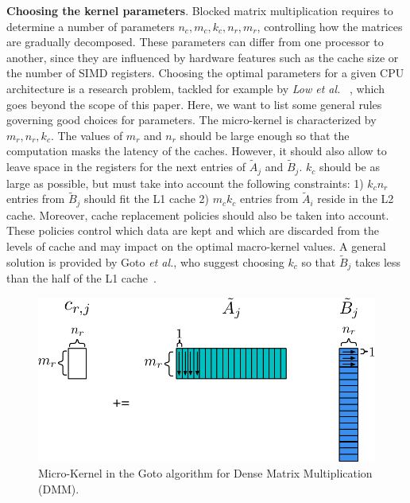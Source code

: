\noindent \textbf{Choosing the  kernel parameters}. Blocked matrix multiplication requires to determine a number of parameters $n_c, m_c, k_c, n_r, m_r$, controlling how the matrices are gradually decomposed. These parameters can differ from one processor to another, since they are influenced by hardware features such as the cache size or the number of SIMD registers. Choosing the optimal parameters for a given CPU architecture is a research problem, tackled for example by \textit{Low et al. }~\cite{low2016analytical}, which goes beyond the scope of this paper. Here, we want to list some general rules governing good choices for parameters. %
The micro-kernel is characterized by $m_r, n_r, k_c$. The values of $m_r$ and $n_r$ should be large enough so that the computation masks the latency of the caches. However, it should also allow to leave space in the registers for the next entries of $\tilde{A}_j$ and $\tilde{B}_j$. $k_c$ should be as large as possible, but must take into account the following constraints: 1) $k_c n_r$ entries from $\tilde{B}_j$ should fit the L1 cache 2) $m_c k_c$ entries from $\tilde{A}_i$ reside in the L2 cache. 
Moreover, cache replacement policies should also be taken into account. These policies control which data are kept and which are discarded from the levels of cache and may impact on the optimal macro-kernel values. A general solution is provided by Goto \textit{et al.}, who suggest choosing $k_c$ so that $\tilde{B}_j$ takes less than the half of the L1 cache~\cite{goto2008anatomy}.

\begin{figure}[t]
	\centering
	\includegraphics[width=0.8\columnwidth ]{imgs/Goto_third.pdf}
	\caption{Micro-Kernel in the Goto algorithm for Dense Matrix Multiplication (DMM).}
	\label{fig:gotothird}
\end{figure}

